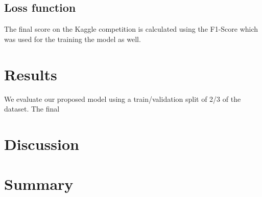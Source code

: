 \documentclass[10pt,conference,compsocconf]{IEEEtran}
\begin{document}
\subsection{Loss function}

The final score on the Kaggle competition \cite{KaggleCompetition} is calculated using the F1-Score which was used for the training the model as well.

\section{Results}

We evaluate our proposed model using a train/validation split of 2/3 of the dataset. The final 


\section{Discussion}

\section{Summary}




\end{document}
